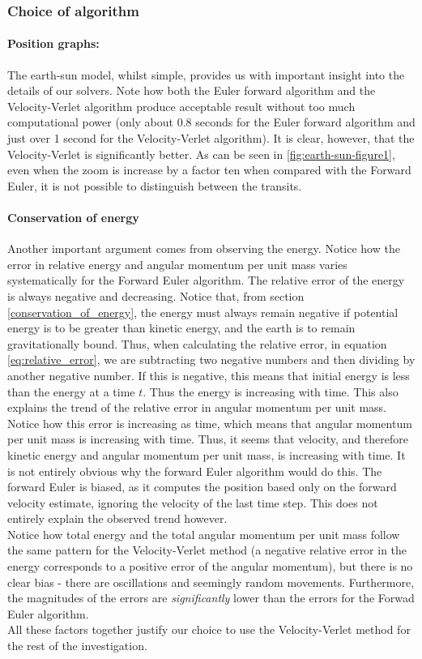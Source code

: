 \documentclass[a4paper, 10pt]{article}
\begin{document}
\subsubsection{Choice of algorithm}
\paragraph{Position graphs:}
The earth-sun model, whilst simple, provides us with important insight into the details of our solvers. Note how both the Euler forward algorithm and the Velocity-Verlet algorithm produce acceptable result without too much computational power (only about 0.8 seconds for the Euler forward algorithm and just over 1 second for the Velocity-Verlet algorithm). It is clear, however, that the Velocity-Verlet is significantly better. As can be seen in \cref{fig:earth-sun-figure1}, even when the zoom is increase by a factor ten when compared with the Forward Euler, it is not possible to distinguish between the transits.
\paragraph{Conservation of energy} 
Another important argument comes from observing the energy. Notice how the error in relative energy and angular momentum per unit mass varies systematically for the Forward Euler algorithm. The relative error of the energy is always negative and decreasing. Notice that, from section \ref{conservation_of_energy}, the energy must always remain negative if potential energy is to be greater than kinetic energy, and the earth is to remain gravitationally bound. Thus, when calculating the relative error, in equation \ref{eq:relative_error}, we are subtracting two negative numbers and then dividing by another negative number. If this is negative, this means that initial energy is less than the energy at a time $t$. Thus the energy is increasing with time. This also explains the trend of the relative error in angular momentum per unit mass. Notice how this error is increasing as time, which means that angular momentum per unit mass is increasing with time. Thus, it seems that velocity, and therefore kinetic energy and angular momentum per unit mass,  is increasing with time. It is not entirely obvious why the forward Euler algorithm would do this. The forward Euler is biased, as it computes the position based only on the forward velocity estimate, ignoring the velocity of the last time step. This does not entirely explain the observed trend however.\\
\linebreak
Notice how total energy and the total angular momentum per unit mass follow the same pattern for the Velocity-Verlet method (a negative relative error in the energy corresponds to a positive error of the angular momentum), but there is no clear bias - there are oscillations and seemingly random movements. Furthermore, the magnitudes of the errors are \textit{significantly} lower than the errors for the Forwad Euler algorithm.\\
\linebreak
\linebreak
All these factors together justify our choice to use the Velocity-Verlet method for the rest of the investigation.
\end{document}

